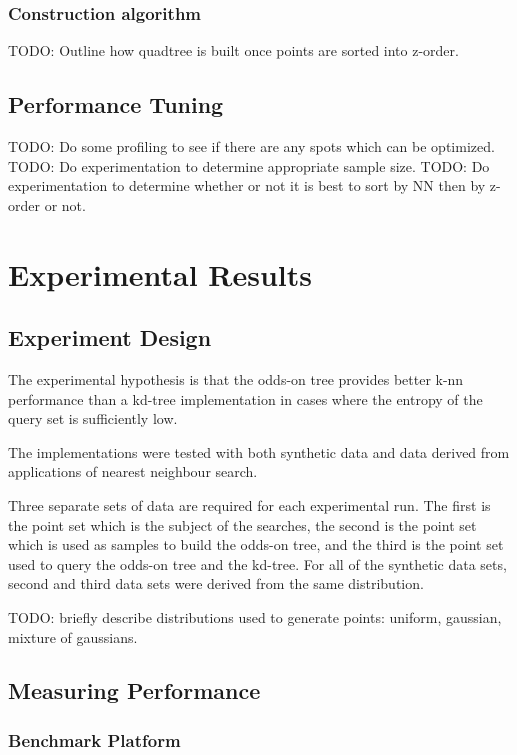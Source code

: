 \documentclass[mcs]{scsthesis}
\begin{document}
\subsection{Construction algorithm}

TODO: Outline how quadtree is built once points are sorted into z-order.

\section{Performance Tuning}

TODO: Do some profiling to see if there are any spots which can be optimized. 
TODO: Do experimentation to determine appropriate sample size.
TODO: Do experimentation to determine whether or not it is best to sort by NN
      then by z-order or not.

\chapter{Experimental Results}

\section{Experiment Design}

The experimental hypothesis is that the odds-on tree provides better k-nn
performance than a kd-tree implementation in cases where the entropy of the
query set is sufficiently low.

The implementations were tested with both synthetic data and data derived
from applications of nearest neighbour search.

Three separate sets of data are required for each experimental run.  The first
is the point set which is the subject of the searches, the second is the point
set which is used as samples to build the odds-on tree, and the third is the
point set used to query the odds-on tree and the kd-tree.  For all of the
synthetic data sets,  second and third data sets were derived from the same
distribution.

TODO: briefly describe distributions used to generate points: uniform, gaussian,
mixture of gaussians.


\section{Measuring Performance}

\subsection{Benchmark Platform}
\end{document}
